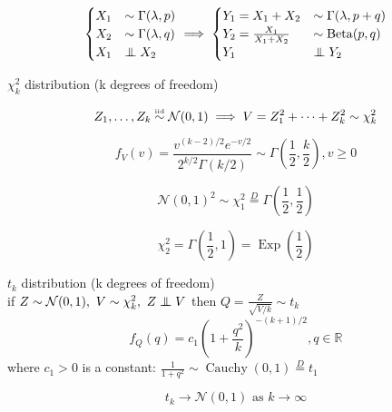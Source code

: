 \documentclass[twocolumn]{amsart}
\newcommand{\Exp}{\operatorname{Exp}}
\newcommand{\Beta}{\operatorname{Beta}}
\newcommand{\Cauchy}{\operatorname{Cauchy}}
\newcommand\iid{\mathrel{\overset{\makebox[0pt]{\mbox{\normalfont\tiny iid}}}{\sim}}}
\newcommand\independent{\protect\mathpalette{\protect\independenT}{\perp}}
\def\independenT#1#2{\mathrel{\rlap{$#1#2$}\mkern3mu{#1#2}}}
\begin{document}
\begin{equation*}
  \begin{cases}
    X_{1} & \sim \Gamma(\lambda, p) \\
    X_{2} & \sim \Gamma(\lambda, q) \\
    X_{1} & \independent X_{2}
  \end{cases}
  \implies
  \begin{cases}
    Y_{1} = X_{1} + X_{2} & \sim \Gamma(\lambda, p + q) \\
    Y_{2} = \frac{X_{1}}{X_{1} + X_{2}} & \sim \Beta(p, q) \\
    Y_{1} & \independent Y_{2}
  \end{cases}
\end{equation*}

$\chi_{k}^{2}$ distribution (k degrees of freedom)

\begin{equation*}
  Z_{1},\ldots,Z_{k}\iid\mathcal{N}(0,1) \implies V =
  Z^{2}_{1}+\cdots+Z^{2}_{k} \sim \chi_{k}^{2}
\end{equation*}

\begin{equation*}
  f_{V}(v) = \frac{v^{(k-2)/2}e^{-v/2}}{2^{k/2}\Gamma(k/2)} \sim
  \Gamma\left(\frac{1}{2},\frac{k}{2}\right), v \geq 0
\end{equation*}

\begin{equation*}
  \mathcal{N}(0,1)^{2} \sim \chi_{1}^{2} \stackrel{D}{=} \Gamma\left(\frac{1}{2},\frac{1}{2}\right)
\end{equation*}

\begin{equation*}
  \chi_{2}^{2} = \Gamma\left(\frac{1}{2},1\right) = \Exp\left(\frac{1}{2}\right)
\end{equation*}

$t_{k}$ distribution (k degrees of freedom)\\
if $Z \sim \mathcal{N}(0, 1),~V \sim \chi_{k}^{2},~Z \independent V$ then $Q = \frac{Z}{\sqrt{V/k}} \sim t_{k}$
\begin{equation*}
  f_{Q}(q) = c_{1}{(1+\frac{q^{2}}{k})}^{-(k+1)/2}, q \in \mathbb{R}
\end{equation*}
where \(c_{1}>0\) is a constant: $\frac{1}{1 + q^{2}} \sim \Cauchy(0,1) \stackrel{D}{=} t_{1}$

\begin{equation*}
  t_{k} \to \mathcal{N}(0,1) \text{ as } k\to\infty
\end{equation*}
\end{document}
